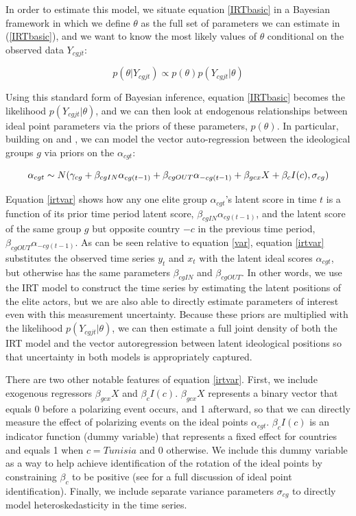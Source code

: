 \documentclass[12pt]{article}
\begin{document}
In order to estimate this model, we situate equation \ref{IRTbasic} in a Bayesian framework in which we define $\theta$ as the full set of parameters we can estimate in (\ref{IRTbasic}), and we want to know the most likely values of $\theta$ conditional on the observed data $Y_{cgjt}$:

\begin{equation}
p(\theta|Y_{cgjt}) \propto p(\theta)p(Y_{cgjt}|\theta)
\end{equation}

Using this standard form of Bayesian inference, equation \ref{IRTbasic} becomes the likelihood $p(Y_{cgjt}|\theta)$, and we can then look at endogenous relationships between ideal point parameters via the priors of these parameters, $p(\theta)$. In particular, building on \textcite{quinn2002} and \textcite{kropko2013}, we can model the vector auto-regression between the ideological groups $g$ via priors on the $\alpha_{cgt}$:

\begin{equation}\label{irtvar}
\alpha_{cgt}  \sim N(\gamma_{cg} + \beta_{cgIN}\alpha_{cg(t-1)} + \beta_{cgOUT}\alpha_{-cg(t-1)} + \beta_{gcx} X + \beta_c I(c),\sigma_{cg})\\
\end{equation}

Equation \ref{irtvar} shows how any one elite group $\alpha_{cgt}$'s latent score in time $t$ is a function of its prior time period latent score, $\beta_{cgIN}\alpha_{cg(t-1)}$, and the latent score of the same group $g$ but opposite country $-c$ in the previous time period, $\beta_{cgOUT}\alpha_{-cg(t-1)}$. As can be seen relative to equation \ref{var}, equation \ref{irtvar} substitutes the observed time series $y_t$ and $x_t$ with the latent ideal scores $\alpha_{cgt}$, but otherwise has the same parameters $\beta_{cgIN}$ and $\beta_{cgOUT}$. In other words, we use the IRT model to construct the time series by estimating the latent positions of the elite actors, but we are also able to directly estimate parameters of interest even with this measurement uncertainty. Because these priors are multiplied with the likelihood $p(Y_{cgjt}|\theta)$, we can then estimate a full joint density of both the IRT model and the vector autoregression between latent ideological positions so that uncertainty in both models is appropriately captured.

There are two other notable features of equation \ref{irtvar}. First, we include exogenous regressors $\beta_{gcx} X$ and $\beta_c I(c)$. $\beta_{gcx} X$ represents a binary vector that equals 0 before a polarizing event occurs, and 1 afterward, so that we can directly measure the effect of polarizing events on the ideal points $\alpha_{cgt}$. $\beta_c I(c)$ is an indicator function (dummy variable) that represents a fixed effect for countries and equals 1 when $c=Tunisia$ and 0 otherwise. We include this dummy variable as a way to help achieve identification of the rotation of the ideal points by constraining $\beta_c$ to be positive (see \parencite{gelman2005} for a full discussion of ideal point identification). Finally, we include separate variance parameters $\sigma_{cg}$ to directly model heteroskedasticity in the time series.
\end{document}
